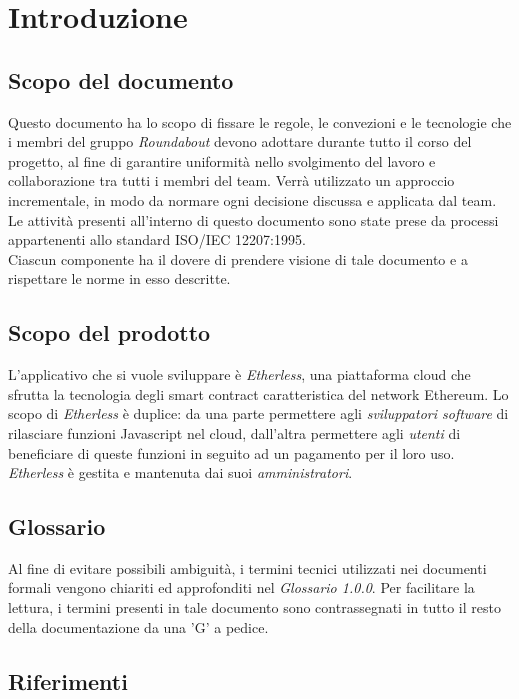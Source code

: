 \section{Introduzione}

\subsection{Scopo del documento}
Questo documento ha lo scopo di fissare le regole, le convezioni e le tecnologie che i membri del gruppo \textit{Roundabout} devono adottare durante tutto il corso del progetto, al fine di garantire uniformità nello svolgimento del lavoro e collaborazione tra tutti i membri del team. 
Verrà utilizzato un approccio incrementale, in modo da normare ogni decisione discussa
e applicata dal team. Le attività presenti all'interno di questo documento sono state prese da processi appartenenti allo standard ISO/IEC 12207:1995. \\
Ciascun componente ha il dovere di prendere visione di tale documento e a rispettare le norme in esso descritte.

\subsection{Scopo del prodotto}
L'applicativo che si vuole sviluppare è \textit{Etherless}, una piattaforma cloud che sfrutta la tecnologia degli smart contract caratteristica del network Ethereum. Lo scopo di \textit{Etherless} è duplice: da una parte permettere agli \textit{sviluppatori software} di rilasciare funzioni Javascript nel cloud, dall'altra permettere agli \textit{utenti} di beneficiare di queste funzioni in seguito ad un pagamento per il loro uso. 
\textit{Etherless} è gestita e mantenuta dai suoi \textit{amministratori}.

\subsection{Glossario}
Al fine di evitare possibili ambiguità, i termini tecnici utilizzati nei documenti formali vengono chiariti ed approfonditi nel \textit{Glossario 1.0.0}. Per facilitare la lettura, i termini presenti in tale documento sono contrassegnati in tutto il resto della documentazione da una 'G' a pedice.

\subsection{Riferimenti}

